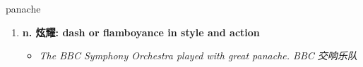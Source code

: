
\begin{frame}
{\huge panache}
\begin{center}
\begin{enumerate}\Large
  \item \textbf{n. 炫耀: dash or flamboyance in style and action}
  \begin{itemize}
    \item \em{\Large{The BBC Symphony Orchestra played with great panache. BBC 交响乐队}}
  \end{itemize}
\end{enumerate}
\end{center}
\end{frame}
